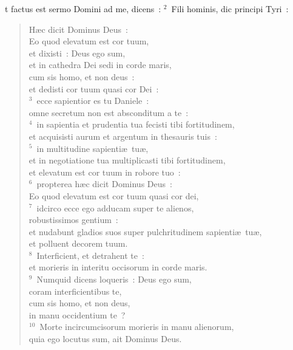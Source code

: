 \bchapter
{}t factus est sermo Domini ad me, dicens~:
${}^{2}$~Fili hominis, dic principi Tyri~: \begin{flushleft}\begin{verse}H\ae c dicit Dominus Deus~:\\ Eo quod elevatum est cor tuum,\\ et dixisti~: Deus ego sum,\\ et in cathedra Dei sedi in corde maris,\\ cum sis homo, et non deus~:\\ et dedisti cor tuum quasi cor Dei~:\\
${}^{3}$~ecce sapientior es tu Daniele~:\\ omne secretum non est absconditum a te~:\\
${}^{4}$~in sapientia et prudentia tua fecisti tibi fortitudinem,\\ et acquisisti aurum et argentum in thesauris tuis~:\\
${}^{5}$~in multitudine sapienti\ae\ tu\ae ,\\ et in negotiatione tua multiplicasti tibi fortitudinem,\\ et elevatum est cor tuum in robore tuo~:\\
${}^{6}$~propterea h\ae c dicit Dominus Deus~:\\ Eo quod elevatum est cor tuum quasi cor dei,\\
${}^{7}$~idcirco ecce ego adducam super te alienos,\\ robustissimos gentium~:\\ et nudabunt gladios suos super pulchritudinem sapienti\ae\ tu\ae ,\\ et polluent decorem tuum.\\
${}^{8}$~Interficient, et detrahent te~:\\ et morieris in interitu occisorum in corde maris.\\
${}^{9}$~Numquid dicens loqueris~: Deus ego sum,\\ coram interficientibus te,\\ cum sis homo, et non deus,\\ in manu occidentium te~?\\
${}^{10}$~Morte incircumcisorum morieris in manu alienorum,\\ quia ego locutus sum, ait Dominus Deus.\end{verse}\end{flushleft}


